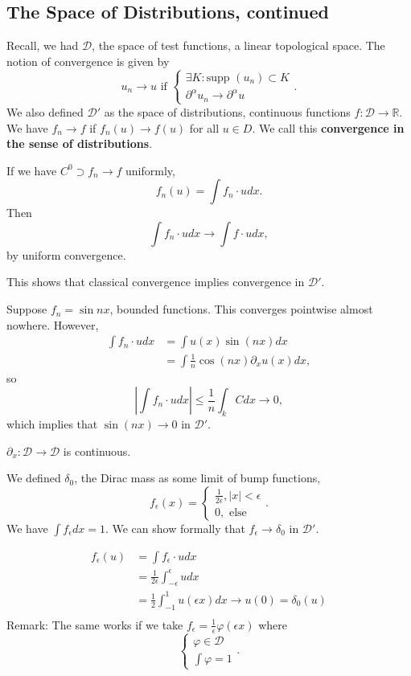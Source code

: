 \documentclass[12pt]{scrartcl}
\newcommand{\R}{\mathbb{R}}
\let \phi \varphi
\newcommand{\supp}{\text{supp }}
\begin{document}
\subsection{The Space of Distributions, continued}
Recall, we had $\mathcal D$, the space of test functions, a linear topological space.  The notion of convergence is given by 
$$u_n \rightarrow u \text{ if } \begin{cases} \exists K : \supp(u_n) \subset K\\
\partial^\alpha u_n \rightarrow \partial^\alpha u
\end{cases}.$$
We also defined $\mathcal D'$ as the space of distributions, continuous functions $f: \mathcal D \rightarrow \R$.  We have $f_n \rightarrow f$ if $f_n(u) \rightarrow f(u)$ for all $u \in D$. We call this \textbf{convergence in the sense of distributions}.
\begin{example} If we have $C^0 \supset f_n \rightarrow f$ uniformly,
$$f_n(u) = \int f_n \cdot u dx.$$
Then
$$\int f_n \cdot u dx \rightarrow \int f \cdot u dx,$$
by uniform convergence.

This shows that classical convergence implies convergence in $\mathcal D'$.
\end{example}
 \begin{example} Suppose $f_n = \sin{nx}$, bounded functions.  This converges pointwise almost nowhere.  However,
\begin{align*}
\int f_n \cdot u dx &=\int u(x)\sin{(nx)}dx\\
&= \int \frac{1}{n}\cos{(nx)} \partial_x u(x)dx,
\end{align*}
so
$$\left |\int f_n\cdot u dx \right| \le \frac{1}{n} \int_k Cdx \rightarrow 0,$$
which implies that $\sin (nx) \rightarrow 0$ in $\mathcal D'$.
 \end{example}
 \begin{proposition} $\partial_x : \mathcal D \rightarrow \mathcal D$ is continuous.
 \end{proposition}
 \begin{example} We defined $\delta_0$, the Dirac mass as some limit of bump functions, $$f_\epsilon(x) = \begin{cases}
 \frac{1}{2\epsilon}, |x| < \epsilon \\
 0, \text{ else}
 \end{cases}.$$
 We have $\int f_\epsilon dx = 1$.  We can show formally that $f_\epsilon \rightarrow \delta_0$ in $\mathcal D'$.
 
\begin{align*}
f_\epsilon(u) &= \int f_\epsilon\cdot u dx\\
&= \frac{1}{2\epsilon} \int_{-\epsilon}^\epsilon u dx\\
&= \frac{1}{2}\int_{-1}^1 u(\epsilon x)dx \rightarrow u(0) = \delta_0(u)\\
\end{align*}
Remark:  The same works if we take $f_\epsilon =\frac{1}{\epsilon}\phi(\epsilon x)$ where 
$$\begin{cases}
\phi \in \mathcal D\\
\int \phi = 1
\end{cases}.$$
\end{example}
\end{document}
